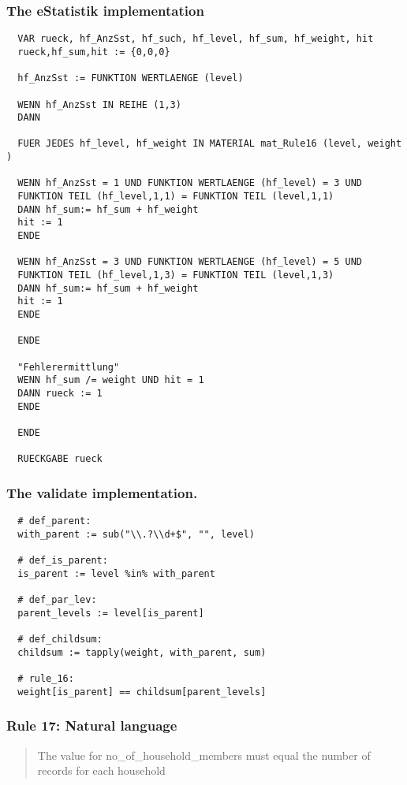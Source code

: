 \subsubsection*{The eStatistik implementation}
\begin{verbatim}
  VAR rueck, hf_AnzSst, hf_such, hf_level, hf_sum, hf_weight, hit
  rueck,hf_sum,hit := {0,0,0}

  hf_AnzSst := FUNKTION WERTLAENGE (level)

  WENN hf_AnzSst IN REIHE (1,3)
  DANN

  FUER JEDES hf_level, hf_weight IN MATERIAL mat_Rule16 (level, weight )

  WENN hf_AnzSst = 1 UND FUNKTION WERTLAENGE (hf_level) = 3 UND
  FUNKTION TEIL (hf_level,1,1) = FUNKTION TEIL (level,1,1)
  DANN hf_sum:= hf_sum + hf_weight
  hit := 1
  ENDE

  WENN hf_AnzSst = 3 UND FUNKTION WERTLAENGE (hf_level) = 5 UND
  FUNKTION TEIL (hf_level,1,3) = FUNKTION TEIL (level,1,3)
  DANN hf_sum:= hf_sum + hf_weight
  hit := 1
  ENDE

  ENDE

  "Fehlerermittlung"
  WENN hf_sum /= weight UND hit = 1
  DANN rueck := 1
  ENDE

  ENDE

  RUECKGABE rueck
\end{verbatim}
\subsubsection*{The validate implementation.}
\begin{verbatim}
  # def_parent:
  with_parent := sub("\\.?\\d+$", "", level)

  # def_is_parent:
  is_parent := level %in% with_parent

  # def_par_lev:
  parent_levels := level[is_parent]

  # def_childsum:
  childsum := tapply(weight, with_parent, sum)

  # rule_16:
  weight[is_parent] == childsum[parent_levels]
\end{verbatim}


\newpage

\subsubsection*{  Rule 17: Natural language}
\begin{quote}


The value for no\_of\_household\_members must equal the number of records for each household


\end{quote}
